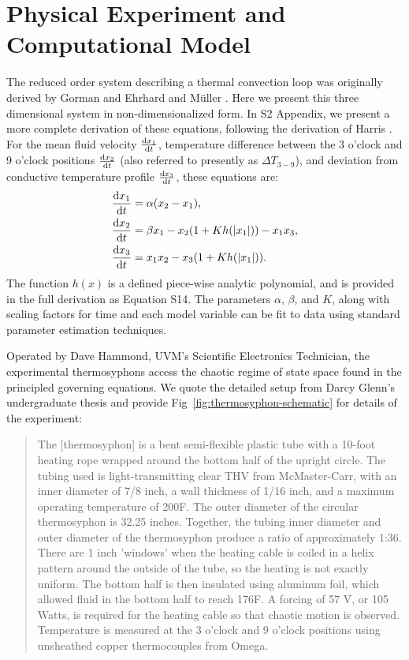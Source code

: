 \documentclass[10pt,letterpaper]{article}
\newcommand{\diff}[2]{\frac{{\rm d}#1}{{\rm d}#2}}
\begin{document}
\section*{Physical Experiment and Computational Model}

The reduced order system describing a thermal convection loop was originally derived by Gorman \cite{gorman1986} and Ehrhard and M\"{u}ller \cite{ehrhard1990dynamical}.
Here we present this three dimensional system in non-dimensionalized form.
In S2 Appendix, we present a more complete derivation of these equations, following the derivation of Harris \cite{harris2011predicting}.
For the mean fluid velocity $\diff{x_1}{t}$, temperature difference between the 3 o'clock and 9 o'clock positions $\diff{x_2}{t}$ (also referred to presently as $\Delta T_{3-9}$), and deviation from conductive temperature profile $\diff{x_3}{t}$, these equations are:
\begin{align}
& \diff{x_1}{t} = \alpha (x_2 - x_1),\\
& \diff{x_2}{t} = \beta x_1 - x_2 (1 + Kh(|x_1|)) - x_1x_3,\\
  & \diff{x_3}{t} = x_1x_2 - x_3 (1 + Kh(|x_1|)) .\end{align}
The function $h(x)$ is a defined piece-wise analytic polynomial, and is provided in the full derivation as Equation S14.
The parameters $\alpha$, $\beta$, and $K$, along with scaling factors for time and each model variable can be fit to data using standard parameter estimation techniques.

Operated by Dave Hammond, UVM's Scientific Electronics Technician, the experimental thermosyphons access the chaotic regime of state space found in the principled governing equations.
We quote the detailed setup from Darcy Glenn's undergraduate thesis \cite{glenn2013} and provide Fig~\ref{fig:thermosyphon-schematic} for details of the experiment:
\begin{quote}
The [thermosyphon] is a bent semi-flexible plastic tube with a 10-foot heating rope wrapped around the bottom half of the upright circle.
The tubing used is light-transmitting clear THV from McMaster-Carr, with an inner diameter of 7/8 inch, a wall thickness of 1/16 inch, and a maximum operating temperature of 200F.
The outer diameter of the circular thermosyphon is 32.25 inches.
Together, the tubing inner diameter and outer diameter of the thermosyphon produce a ratio of approximately 1:36.
There are 1 inch 'windows' when the heating cable is coiled in a helix pattern around the outside of the tube, so the heating is not exactly uniform.
The bottom half is then insulated using aluminum foil, which allowed fluid in the bottom half to reach 176F.
A forcing of 57 V, or 105 Watts, is required for the heating cable so that chaotic motion is observed.
Temperature is measured at the 3 o'clock and 9 o'clock positions using unsheathed copper thermocouples from Omega.
\end{quote}
\end{document}
